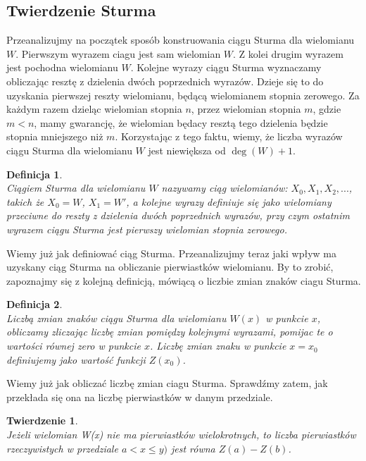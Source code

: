 \documentclass[twoside,a4paper]{book}
\newtheorem{theorem}{Twierdzenie}
\newtheorem{definition}{Definicja}
\begin{document}
\subsection{Twierdzenie Sturma}

Przeanalizujmy na początek sposób konstruowania ciągu Sturma dla wielomianu $W$. Pierwszym wyrazem ciagu jest sam wielomian $W$. Z kolei drugim wyrazem jest pochodna wielomianu $W$. Kolejne wyrazy ciągu Sturma wyznaczamy obliczając resztę z dzielenia dwóch poprzednich wyrazów. Dzieje się to do uzyskania pierwszej reszty wielomianu, będącą wielomianem stopnia zerowego. Za każdym razem dzieląc wielomian stopnia $n$, przez wielomian stopnia $m$, gdzie $m<n$, mamy gwarancję, że wielomian będacy resztą tego dzielenia będzie stopnia mniejszego niż $m$. Korzystając z tego faktu, wiemy, że liczba wyrazów ciągu Sturma dla wielomianu $W$ jest niewiększa od $\deg(W)+1$.

\begin{definition}
	$ $ \\
	Ciągiem Sturma dla wielomianu $W$ nazywamy ciąg wielomianów: $X_0, X_1, X_2,...$, takich że $X_0=W$, $X_1=W'$, a kolejne wyrazy definiuje się jako wielomiany przeciwne do reszty z dzielenia dwóch poprzednich wyrazów, przy czym ostatnim wyrazem ciągu Sturma jest pierwszy wielomian stopnia zerowego. 
\end{definition}

Wiemy już jak definiować ciąg Sturma. Przeanalizujmy teraz jaki wpływ ma uzyskany ciąg Sturma na obliczanie pierwiastków wielomianu. By to zrobić, zapoznajmy się z kolejną definicją, mówiącą o liczbie zmian znaków ciagu Sturma.

\begin{definition}
	$ $ \\
	Liczbą zmian znaków ciągu Sturma dla wielomianu $W(x)$ w punkcie $x$, obliczamy zliczając liczbę zmian pomiędzy kolejnymi wyrazami, pomijac te o wartości równej zero w punkcie $x$. Liczbę zmian znaku w punkcie $x=x_0$ definiujemy jako wartość funkcji $Z(x_0)$.
\end{definition}

Wiemy już jak obliczać liczbę zmian ciagu Sturma. Sprawdźmy zatem, jak przekłada się ona na liczbę pierwiastków w danym przedziale.

\begin{theorem}
	$ $ \\
	Jeżeli wielomian W(x) nie ma pierwiastków wielokrotnych, to liczba pierwiastków rzeczywistych w przedziale $a<x\le y)$ jest równa $Z(a) - Z(b)$.
\end{theorem}
\end{document}
